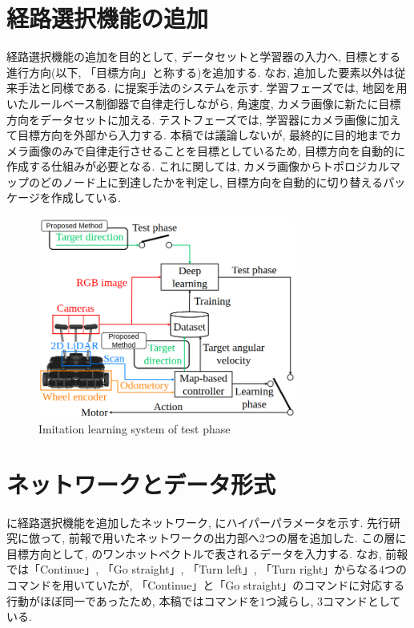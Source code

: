\documentclass{jarticle}
\begin{document}
\section{経路選択機能の追加}
経路選択機能の追加を目的として, データセットと学習器の入力へ, 目標とする進行方向(以下, 「目標方向」と称する)を追加する. なお, 追加した要素以外は従来手法と同様である. に提案手法のシステムを示す. 学習フェーズでは, 地図を用いたルールベース制御器で自律走行しながら, 角速度, カメラ画像に新たに目標方向をデータセットに加える. テストフェーズでは, 学習器にカメラ画像に加えて目標方向を外部から入力する. 本稿では議論しないが, 最終的に目的地までカメラ画像のみで自律走行させることを目標としているため, 目標方向を自動的に作成する仕組みが必要となる. これに関しては, カメラ画像からトポロジカルマップのどのノード上に到達したかを判定し, 目標方向を自動的に切り替えるパッケージを作成している\cite{graph}.

\begin{figure}[h]
  \centering
   \includegraphics[width=85mm]{system2.png}
   \vspace*{-4mm}
   \caption{Imitation learning system of test phase}
   \label{fig: fig3}
 \end{figure}

\section{ネットワークとデータ形式}
に経路選択機能を追加したネットワーク, にハイパーパラメータを示す. 
先行研究に倣って, 前報で用いたネットワークの出力部へ2つの層を追加した. この層に目標方向として, のワンホットベクトルで表されるデータを入力する. なお, 前報\cite{mech}では「Continue」, 「Go straight」, 「Turn left」, 「Turn right」からなる4つのコマンドを用いていたが, 「Continue」と「Go straight」のコマンドに対応する行動がほぼ同一であったため, 本稿ではコマンドを1つ減らし, 3コマンドとしている. 
\end{document}
